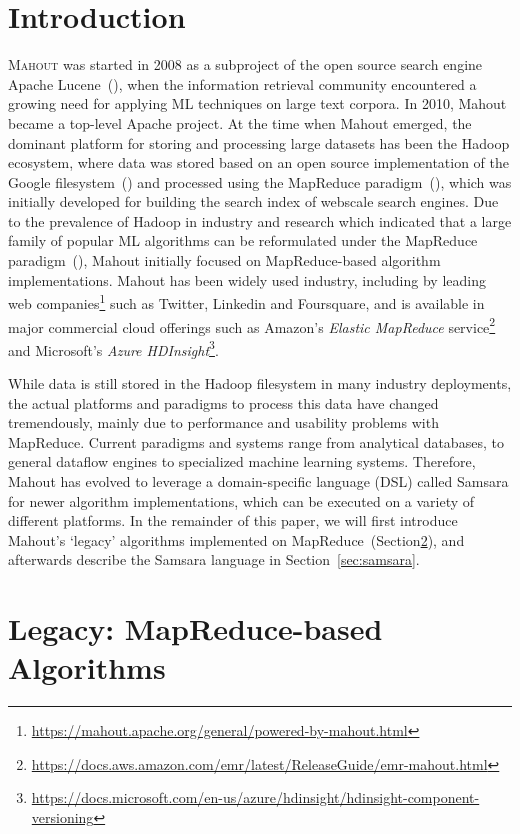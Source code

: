 \documentclass[twoside,11pt]{article}
\begin{document}
\section{Introduction}

\textsc{Mahout} was started in 2008 as a subproject of the open source search engine Apache Lucene~(\cite{Owen2012,Mccandless2010}), when the information retrieval community encountered a growing need for applying ML techniques on large text corpora. In 2010, Mahout became a top-level Apache project. At the time when Mahout emerged, the dominant platform for storing and processing large datasets has been the Hadoop ecosystem, where data was stored based on an open source implementation of the Google filesystem~(\cite{Ghemawat2003}) and processed using the MapReduce paradigm~(\cite{Dean2008}), which was initially developed for building the search index of webscale search engines. Due to the prevalence of Hadoop in industry and research which indicated that a large family of popular ML algorithms can be reformulated under the MapReduce paradigm~(\cite{Chu2007}), Mahout initially focused on MapReduce-based algorithm implementations. Mahout has been widely used industry, including by leading web companies\footnote{\url{https://mahout.apache.org/general/powered-by-mahout.html}} such as Twitter, Linkedin and Foursquare, and is available in major commercial cloud offerings such as Amazon's \textit{Elastic MapReduce} service\footnote{\url{https://docs.aws.amazon.com/emr/latest/ReleaseGuide/emr-mahout.html}} and Microsoft's \textit{Azure HDInsight}\footnote{\url{https://docs.microsoft.com/en-us/azure/hdinsight/hdinsight-component-versioning}}.

While data is still stored in the Hadoop filesystem in many industry deployments, the actual platforms and paradigms to process this data have changed tremendously, mainly due to performance and usability problems with MapReduce. Current paradigms and systems range from analytical databases, to general dataflow engines to specialized machine learning systems. Therefore, Mahout has evolved to leverage a domain-specific language (DSL) called Samsara for newer algorithm implementations, which can be executed on a variety of different platforms. In the remainder of this paper, we will first introduce Mahout's `legacy' algorithms implemented on MapReduce~(Section\ref{sec:legacy}), and afterwards describe the Samsara language in Section~\ref{sec:samsara}.

\section{Legacy: MapReduce-based Algorithms}
\label{sec:legacy}
\end{document}
